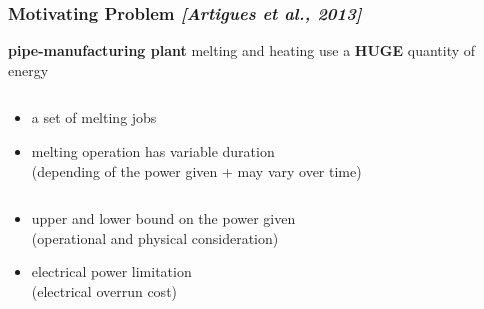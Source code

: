 \begin{frame}
  \frametitle{Motivating Problem 
    {\small \it \color{gray!50!black!50} [Artigues et al., 2013]}}
  \vfill 
  \begin{block}{\bf \large  pipe-manufacturing plant} 
    melting and heating use a {\bf HUGE} quantity of energy
  \end{block}
  \vfill
  \begin{columns}
    \begin{column}{0.5\linewidth}
      \begin{itemize}
      \item a set of melting jobs
        \vspace{0.4cm}
      \item melting operation has variable duration\\
        {\small (depending of the power given + may vary over time)}
        \vspace{0.4cm}
      \end{itemize}     
    \end{column}
    \hfill 
    \begin{column}{0.4\linewidth}
    \end{column}
  \end{columns}
  \vfill
  \begin{itemize}
  \item upper and lower bound on the power given \\
    {\small(operational and physical consideration)}
    \vspace{0.4cm}
  \item electrical power limitation\\
    {\small(electrical overrun cost)}
  \end{itemize}
\end{frame}

